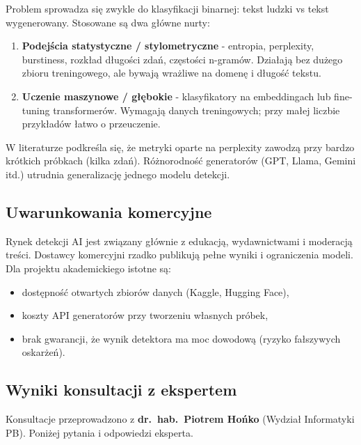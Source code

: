 Problem sprowadza się zwykle do klasyfikacji binarnej: tekst ludzki vs tekst wygenerowany. Stosowane są dwa główne nurty:

\begin{enumerate}
	\item \textbf{Podejścia statystyczne / stylometryczne} - entropia, perplexity, burstiness, rozkład długości zdań, częstości n-gramów. Działają bez dużego zbioru treningowego, ale bywają wrażliwe na domenę i długość tekstu.
	\item \textbf{Uczenie maszynowe / głębokie} - klasyfikatory na embeddingach lub fine-tuning transformerów. Wymagają danych treningowych; przy małej liczbie przykładów łatwo o przeuczenie.
\end{enumerate}

W literaturze podkreśla się, że metryki oparte na perplexity zawodzą przy bardzo krótkich próbkach (kilka zdań). Różnorodność generatorów (GPT, Llama, Gemini itd.) utrudnia generalizację jednego modelu detekcji.

\subsection{Uwarunkowania komercyjne}

Rynek detekcji AI jest związany głównie z edukacją, wydawnictwami i moderacją treści. Dostawcy komercyjni rzadko publikują pełne wyniki i ograniczenia modeli. Dla projektu akademickiego istotne są:

\begin{itemize}
	\item dostępność otwartych zbiorów danych (Kaggle, Hugging Face),
	\item koszty API generatorów przy tworzeniu własnych próbek,
	\item brak gwarancji, że wynik detektora ma moc dowodową (ryzyko fałszywych oskarżeń).
\end{itemize}

\subsection{Wyniki konsultacji z ekspertem}

Konsultacje przeprowadzono z \textbf{dr.\ hab.\ Piotrem Hońko} (Wydział Informatyki PB). Poniżej pytania i odpowiedzi eksperta.

